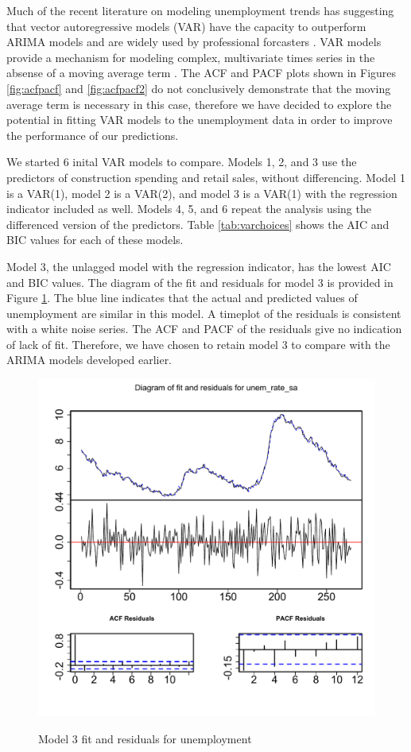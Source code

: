 \documentclass[twoside,twocolumn]{article}
\begin{document}
      
     Much of the recent literature on modeling unemployment trends has suggesting that vector autoregressive models (VAR) have the capacity to outperform ARIMA models and are widely used by professional forcasters \citep{Meyer2015, Tasci2015, Barnichon2016}. VAR models provide a mechanism for modeling complex, multivariate times series in the absense of a moving average term \citep{Chatfield2001} . The ACF and PACF plots shown in Figures \ref{fig:acfpacf} and \ref{fig:acfpacf2} do not conclusively demonstrate that the moving average term is necessary in this case, therefore we have decided to explore the potential in fitting VAR models to the unemployment data in order to improve the performance of our predictions.  

We started 6 inital VAR models to compare. Models 1, 2, and 3 use the predictors of construction spending and retail sales, without differencing. Model 1 is a VAR(1), model 2 is a VAR(2), and model 3 is a VAR(1) with the regression indicator included as well. Models 4, 5, and 6 repeat the analysis using the differenced version of the predictors. Table \ref{tab:varchoices} shows the AIC and BIC values for each of these models.  

Model 3, the unlagged model with the regression indicator, has the lowest AIC and BIC values.  The diagram of the fit and residuals for model 3 is provided in Figure \ref{fig:varfitmodel3}. The blue line indicates that the actual and predicted values of unemployment are similar in this model. A timeplot of the residuals is consistent with a white noise series. The ACF and PACF of the residuals give no indication of lack of fit. Therefore, we have chosen to retain model 3 to compare with the ARIMA models developed earlier. 


   \begin{figure}[htb]
    	\centering
     	\caption{Model 3 fit and residuals for unemployment}
     	\includegraphics[width=\linewidth]{images/varfitmodel3}
     	\label{fig:varfitmodel3}
 \end{figure}
 
\end{document}
